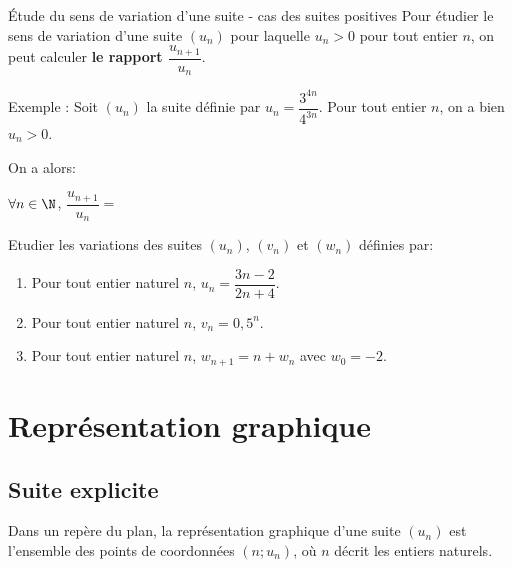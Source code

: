 \documentclass[a4paper]{article}
\begin{document}
\begin{methode}{\'Etude du sens de variation d'une suite - cas des suites positives}{}
  Pour étudier le sens de variation d'une suite $(u_n)$ pour laquelle $u_n > 0$ pour tout entier $n$,
  on peut calculer \textbf{le rapport $\dfrac{u_{n+1}}{u_{n}}$}.

  Exemple : Soit $(u_n)$ la suite définie par $u_n=\dfrac{3^{4n}}{4^{3n}}$. Pour tout entier $n$, on a bien $u_n > 0$. 
  
  On a alors:
  
\vspace{.3cm}
  $\forall n \in \N$, $\dfrac{u_{n+1}}{u_n}=$

  \vspace{5cm}

\end{methode}

\begin{exerciceapp}{}{}
Etudier les variations des suites $(u_n)$, $(v_n)$ et $(w_n)$ définies par:
\begin{enumerate}
  \item Pour tout entier naturel $n$, $u_n=\dfrac{3n-2}{2n+4}$.
  \item Pour tout entier naturel $n$, $v_n=0,5^n$.
  \item Pour tout entier naturel $n$, $w_{n+1}=n+w_n$ avec $w_0=-2$.
\end{enumerate}
\end{exerciceapp}


\pagebreak


		\section{Représentation graphique}

    \subsection{Suite explicite}
		\begin{definition}{}{}
			Dans un repère du plan, la représentation graphique d'une suite $(u_n)$ est l'ensemble des
			points de coordonnées $(n;u_n)$, où $n$ décrit les entiers naturels.
		\end{definition}
\end{document}
